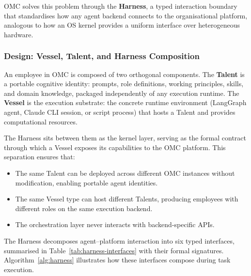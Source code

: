 \documentclass[11pt,a4paper]{article}
\begin{document}
OMC solves this problem through the \textbf{Harness}, a typed interaction boundary that standardises how any agent backend connects to the organisational platform, analogous to how an OS kernel provides a uniform interface over heterogeneous hardware.

\subsubsection{Design: Vessel, Talent, and Harness Composition}

An employee in OMC is composed of two orthogonal components.  The \textbf{Talent} is a portable cognitive identity: prompts, role definitions, working principles, skills, and domain knowledge, packaged independently of any execution runtime.  The \textbf{Vessel} is the execution substrate: the concrete runtime environment (LangGraph agent, Claude CLI session, or script process) that hosts a Talent and provides computational resources.

The Harness sits between them as the kernel layer, serving as the formal contract through which a Vessel exposes its capabilities to the OMC platform. This separation ensures that:
\begin{itemize}
    \item The same Talent can be deployed across different OMC instances without modification, enabling portable agent identities.
    \item The same Vessel type can host different Talents, producing employees with different roles on the same execution backend.
    \item The orchestration layer never interacts with backend-specific APIs.
\end{itemize}

The Harness decomposes agent--platform interaction into six typed interfaces, summarised in Table~\ref{tab:harness-interfaces} with their formal signatures.  Algorithm~\ref{alg:harness} illustrates how these interfaces compose during task execution.
\end{document}

